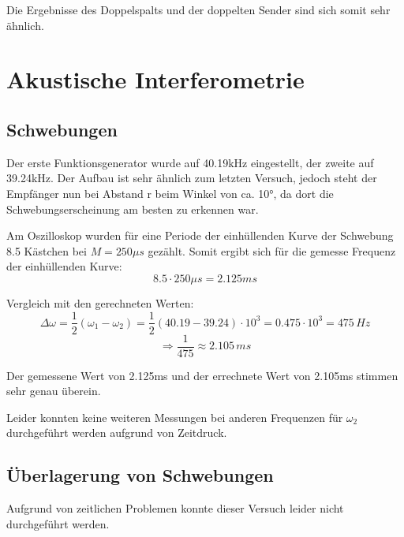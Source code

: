 \documentclass[
  headings=optiontotocandhead,
  twoside,
  openright,
  numbers=noenddot,
  toc=flat,
  11pt,
  parskip=full,
  listof=flat,
  bibliography=totoc,
  a4paper,
  DIV=14,
  BCOR=22mm,
  headheight=5mm,
  headinclude=true,
]{scrartcl}
\begin{document}
Die Ergebnisse des Doppelspalts und der doppelten Sender sind sich somit sehr ähnlich.

\section{Akustische Interferometrie}

\subsection{Schwebungen}

Der erste Funktionsgenerator wurde auf 40.19kHz eingestellt, der zweite auf 39.24kHz. Der Aufbau ist sehr ähnlich zum letzten Versuch, jedoch steht der Empfänger nun bei Abstand r beim Winkel von ca. 10°, da dort die Schwebungserscheinung am besten zu erkennen war.

Am Oszilloskop wurden für eine Periode der einhüllenden Kurve der Schwebung 8.5 Kästchen bei $M = 250 \mu s$ gezählt. Somit ergibt sich für die gemesse Frequenz der einhüllenden Kurve:
$$ 8.5 \cdot 250 \mu s = 2.125 ms $$

Vergleich mit den gerechneten Werten:
$$ \Delta \omega = \frac{1}{2}(\omega_1 - \omega_2) = \frac{1}{2}(40.19 - 39.24) \cdot 10^3 = 0.475 \cdot 10^3 = 475\,Hz $$
$$ \Rightarrow \frac{1}{475} \approx 2.105\,ms $$

Der gemessene Wert von 2.125ms und der errechnete Wert von 2.105ms stimmen sehr genau überein.

Leider konnten keine weiteren Messungen bei anderen Frequenzen für $\omega_2$ durchgeführt werden aufgrund von Zeitdruck. 

\subsection{Überlagerung von Schwebungen}

Aufgrund von zeitlichen Problemen konnte dieser Versuch leider nicht durchgeführt werden.
\end{document}
